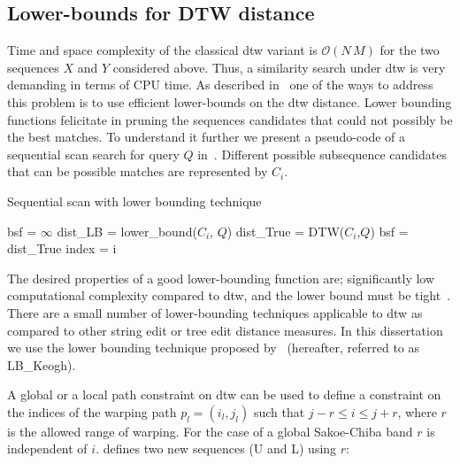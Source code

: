 
\subsection{Lower-bounds for DTW distance}
\label{sec:background_lowerbound}

Time and space complexity of the classical \gls{dtw} variant is $\mathcal{O}(N\,M)$ for the two sequences $X$ and $Y$ considered above. Thus, a similarity search under \gls{dtw} is very demanding in terms of CPU time. As described in~\cite{Keogh2004} one of the ways to address this problem is to use efficient lower-bounds on the \gls{dtw} distance. Lower bounding functions felicitate in pruning the sequences candidates that could not possibly be the best matches. To understand it further we present a pseudo-code of a sequential scan search for query $Q$ in~. Different possible subsequence candidates that can be possible matches are represented by $C_i$.%

\begin{algorithm}
	\caption{Sequential scan with lower bounding technique}
	\label{alg:sequential_scan_lower_bound}
	\begin{algorithmic}
		\State bsf = $\infty$	
			\State dist\_LB = lower\_bound($C_i$, $Q$)
				\State dist\_True = DTW($C_i$,$Q$)	
					\State bsf = dist\_True
					\State index = i 
				\EndIf
			\EndIf
		
		\EndFor
		
	\end{algorithmic}
\end{algorithm}

The desired properties of a good lower-bounding function are; significantly low computational complexity compared to \gls{dtw}, and the lower bound must be tight~\citep{Keogh2004}. There are a small number of lower-bounding techniques applicable to \gls{dtw} as compared to other string edit or tree edit distance measures. In this dissertation we use the lower bounding technique proposed by~\cite{Keogh2004} (hereafter, referred to as LB\_Keogh). 

A global or a local path constraint on \gls{dtw} can be used to define a constraint on the indices of the warping path $p_l = (i_l, j_l)$ such that $j-r \leq i \leq j+r$, where $r$ is the allowed range of warping. For the case of a global Sakoe-Chiba band $r$ is independent of $i$. \cite{Keogh2004} defines two new sequences ($\mathrm{U}$ and $\mathrm{L}$) using $r$:

